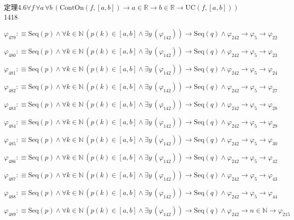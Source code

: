 \begin{fullproof}{定理4.6}{$\forall f\,\forall a\,\forall b\,(\mathrm{ContOn}(f,[a,b]) \to a \in \mathbb{R} \to b \in \mathbb{R} \to \mathrm{UC}(f,[a,b]))$}{1418}
\begin{abbrevlist}
\item $\varphi_{479} :\equiv \mathrm{Seq}(p) \land \forall k \in \mathbb{N}\,(p(k) \in [a,b] \land \exists y\,(\varphi_{142})) \to \mathrm{Seq}(q) \land \varphi_{242} \to \varphi_{5} \to \varphi_{22}$
\item $\varphi_{480} :\equiv \mathrm{Seq}(p) \land \forall k \in \mathbb{N}\,(p(k) \in [a,b] \land \exists y\,(\varphi_{142})) \to \mathrm{Seq}(q) \land \varphi_{242} \to \varphi_{5} \to \varphi_{23}$
\item $\varphi_{481} :\equiv \mathrm{Seq}(p) \land \forall k \in \mathbb{N}\,(p(k) \in [a,b] \land \exists y\,(\varphi_{142})) \to \mathrm{Seq}(q) \land \varphi_{242} \to \varphi_{5} \to \varphi_{24}$
\item $\varphi_{482} :\equiv \mathrm{Seq}(p) \land \forall k \in \mathbb{N}\,(p(k) \in [a,b] \land \exists y\,(\varphi_{142})) \to \mathrm{Seq}(q) \land \varphi_{242} \to \varphi_{5} \to \varphi_{27}$
\item $\varphi_{483} :\equiv \mathrm{Seq}(p) \land \forall k \in \mathbb{N}\,(p(k) \in [a,b] \land \exists y\,(\varphi_{142})) \to \mathrm{Seq}(q) \land \varphi_{242} \to \varphi_{5} \to \varphi_{28}$
\item $\varphi_{484} :\equiv \mathrm{Seq}(p) \land \forall k \in \mathbb{N}\,(p(k) \in [a,b] \land \exists y\,(\varphi_{142})) \to \mathrm{Seq}(q) \land \varphi_{242} \to \varphi_{5} \to \varphi_{29}$
\item $\varphi_{485} :\equiv \mathrm{Seq}(p) \land \forall k \in \mathbb{N}\,(p(k) \in [a,b] \land \exists y\,(\varphi_{142})) \to \mathrm{Seq}(q) \land \varphi_{242} \to \varphi_{5} \to \varphi_{30}$
\item $\varphi_{486} :\equiv \mathrm{Seq}(p) \land \forall k \in \mathbb{N}\,(p(k) \in [a,b] \land \exists y\,(\varphi_{142})) \to \mathrm{Seq}(q) \land \varphi_{242} \to \varphi_{5} \to \varphi_{42}$
\item $\varphi_{487} :\equiv \mathrm{Seq}(p) \land \forall k \in \mathbb{N}\,(p(k) \in [a,b] \land \exists y\,(\varphi_{142})) \to \mathrm{Seq}(q) \land \varphi_{242} \to \varphi_{5} \to \varphi_{43}$
\item $\varphi_{488} :\equiv \mathrm{Seq}(p) \land \forall k \in \mathbb{N}\,(p(k) \in [a,b] \land \exists y\,(\varphi_{142})) \to \mathrm{Seq}(q) \land \varphi_{242} \to \varphi_{5} \to \varphi_{44}$
\item $\varphi_{489} :\equiv \mathrm{Seq}(p) \land \forall k \in \mathbb{N}\,(p(k) \in [a,b] \land \exists y\,(\varphi_{142})) \to \mathrm{Seq}(q) \land \varphi_{242} \to n \in \mathbb{N} \to \varphi_{215}$

\end{abbrevlist}
\end{fullproof}

